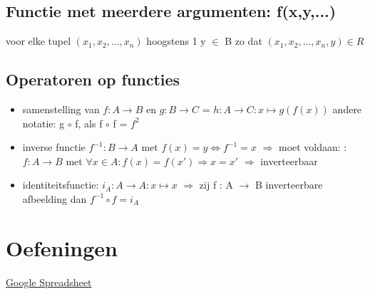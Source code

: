 \documentclass{article}
\begin{document}
\subsection{Functie met meerdere argumenten: f(x,y,...)}
voor elke tupel $(x_{1},x_{2},...,x_{n})$ hoogstens 1 y $\in$ B zo dat $(x_{1},x_{2},...,x_{n},y) \in R$

\subsection{Operatoren op functies}
\begin{itemize}
    \item samenstelling van $f: A \rightarrow B$ en $g: B \rightarrow C$ = $h: A \rightarrow C : x \mapsto g(f(x))$ \newline andere notatie: g $\circ$ f, als f $\circ$ f = $f^2$
    \item inverse functie $f^{-1}: B \rightarrow A$ met $f(x) = y \iff f^{-1} = x$ 
    \newline $\Rightarrow$ moet voldaan: : $f: A \rightarrow B$ met $\forall x \in A: f(x) = f(x') \Rightarrow x=x'$ 
    \newline $\Rightarrow$ inverteerbaar
    \item identiteitsfunctie: $i_{A} : A \rightarrow A : x \mapsto x$ 
    \newline $\Rightarrow$ zij f : A $\rightarrow$ B inverteerbare afbeelding dan $f^{-1} \circ f = i_{A}$
\end{itemize}

\section{Oefeningen}
\href{https://docs.google.com/spreadsheets/d/1thtWaGEHPFeVuYDWK-XKuEimLSO2Zc_yDwdODAbYIok/edit#gid=0}{Google Spreadsheet}
\end{document}
